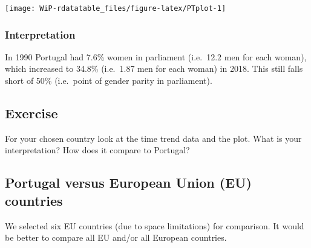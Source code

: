 \documentclass[a4paper,9pt,twocolumn,twoside,printwatermark=false]{pinp}
\begin{document}
\begin{center}\texttt{[image: WiP-rdatatable\_files/figure-latex/PTplot-1]} \end{center}

\subsubsection{Interpretation}\label{interpretation}

In 1990 Portugal had 7.6\% women in parliament (i.e.~12.2 men for each
woman), which increased to 34.8\% (i.e.~1.87 men for each woman) in
2018. This still falls short of 50\% (i.e.~point of gender parity in
parliament).

\subsection{Exercise}\label{exercise-4}

For your chosen country look at the time trend data and the plot. What
is your interpretation? How does it compare to Portugal?

\subsection{Portugal versus European Union (EU)
countries}\label{portugal-versus-european-union-eu-countries}

We selected six EU countries (due to space limitations) for comparison.
It would be better to compare all EU and/or all European countries.

\begin{Shaded}
\end{Shaded}
\end{document}
